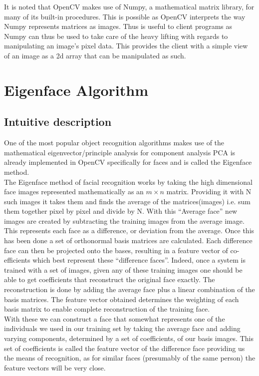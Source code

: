 		\newpage
		It is noted that OpenCV makes use of Numpy, a mathematical matrix library, for many of its built-in procedures.  
		This is possible as OpenCV interprets the way Numpy represents matrices as images.  Thus is useful to client
		programs as Numpy can thus be used to take care of the heavy lifting with regards to manipulating an image's pixel 
		data.  This provides the client with a simple view of an image as a 2d array that can be manipulated as such.
		
		
		\section{Eigenface Algorithm}
			\subsection{Intuitive description}
			One of the most popular object recognition algorithms makes use of the mathematical eigenvector/principle 
			analysis for component analysis PCA is already implemented in OpenCV specifically for faces and is called 
			the Eigenface method. \\
			
			The Eigenface method of facial recognition works by taking the high dimensional face images represented 
			mathematically as an $m \times n$ matrix.  Providing it with N such images it takes them and finds the 
			average of the matrices(images) i.e. sum them together pixel by pixel and divide by N.  With this ``Average 
			face'' new images are created by subtracting the training images from the average image.  This represents each 
			face as a difference, or deviation from the average.  Once this has been done a set of orthonormal basis 
			matrices are calculated.  Each difference face can then be projected onto the bases, resulting in a feature
			vector of co-efficients which best represent these ``difference faces''.  Indeed, once a system is trained with 
			a set of images, given any of these training images one should be able to get coefficients that reconstruct 
			the original face exactly.  The reconstruction is done by adding the average face plus a linear combination 
			of the basis matrices.  The feature vector obtained determines the weighting of each basis matrix to enable 
			complete reconstruction of the training face. \\ 

			With these we can construct a face that somewhat represents one of the individuals we used in our training 
			set by taking the average face and adding varying components, determined by	a set of coefficients, of our 
			basis images.  This set of coefficients is called the feature vector of the difference face providing us the 
			means of recognition, as for similar faces (presumably of the same person) the feature vectors will be very 
			close.  
		

